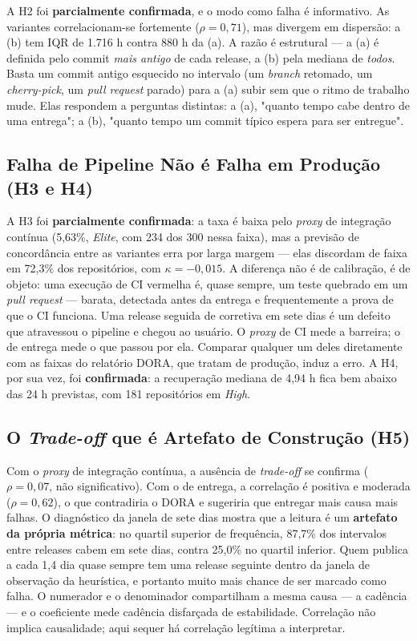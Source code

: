 A H2 foi \textbf{parcialmente confirmada}, e o modo como falha é informativo. As variantes
correlacionam-se fortemente ($\rho = 0{,}71$), mas divergem em dispersão: a (b) tem IQR de
1.716 h contra 880 h da (a). A razão é estrutural --- a (a) é definida pelo commit \emph{mais
antigo} de cada release, a (b) pela mediana de \emph{todos}. Basta um commit antigo esquecido
no intervalo (um \emph{branch} retomado, um \emph{cherry-pick}, um \emph{pull request}
parado) para a (a) subir sem que o ritmo de trabalho mude. Elas respondem a perguntas
distintas: a (a), "quanto tempo cabe dentro de uma entrega"; a (b), "quanto tempo um commit
típico espera para ser entregue".

\subsection{Falha de Pipeline Não é Falha em Produção (H3 e H4)}

A H3 foi \textbf{parcialmente confirmada}: a taxa é baixa pelo \emph{proxy} de integração contínua (5,63\%,
\emph{Elite}, com 234 dos 300 nessa faixa), mas a previsão de concordância entre as variantes
erra por larga margem --- elas discordam de faixa em 72,3\% dos repositórios, com
$\kappa = -0{,}015$. A diferença não é de calibração, é de objeto: uma execução de CI
vermelha é, quase sempre, um teste quebrado em um \emph{pull request} --- barata, detectada
antes da entrega e frequentemente a prova de que o CI funciona. Uma release seguida de
corretiva em sete dias é um defeito que atravessou o pipeline e chegou ao usuário. O
\emph{proxy} de CI mede a barreira; o de entrega mede o que passou por ela. Comparar qualquer
um deles diretamente com as faixas do relatório DORA, que tratam de produção, induz a erro.
A H4, por sua vez, foi \textbf{confirmada}: a recuperação mediana de 4,94 h fica bem abaixo
das 24 h previstas, com 181 repositórios em \emph{High}.

\subsection{O \emph{Trade-off} que é Artefato de Construção (H5)}

Com o \emph{proxy} de integração contínua, a ausência de \emph{trade-off} se confirma ($\rho = 0{,}07$, não
significativo). Com o de entrega, a correlação é positiva e moderada ($\rho = 0{,}62$), o que
contradiria o DORA e sugeriria que entregar mais causa mais falhas. O diagnóstico da janela
de sete dias mostra que a leitura é um \textbf{artefato da própria métrica}: no quartil
superior de frequência, 87,7\% dos intervalos entre releases cabem em sete dias, contra
25,0\% no quartil inferior. Quem publica a cada 1,4 dia quase sempre tem uma release seguinte
dentro da janela de observação da heurística, e portanto muito mais chance de ser marcado
como falha. O numerador e o denominador compartilham a mesma causa --- a cadência --- e o
coeficiente mede cadência disfarçada de estabilidade. Correlação não implica causalidade;
aqui sequer há correlação legítima a interpretar.

